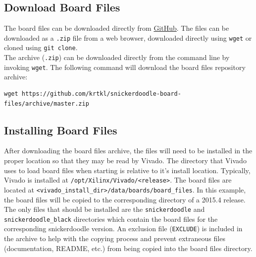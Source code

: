 \subsection{Download Board Files}
The board files can be downloaded directly from \href{https://github.com/krtkl/snickerdoodle-board-files}{GitHub}. The files can be downloaded as a \texttt{.zip} file from a web browser, downloaded directly using \texttt{wget} or cloned using \texttt{git clone}. \\



\noindent
The archive (\texttt{.zip}) can be downloaded directly from the command line by invoking \texttt{wget}. The following command will download the board files repository archive:

\begin{fullwidth}
\begin{lstlisting}[style=text]
wget https://github.com/krtkl/snickerdoodle-board-files/archive/master.zip
\end{lstlisting}
\end{fullwidth}


\subsection{Installing Board Files}


After downloading the board files archive, the files will need to be installed in the proper location so that they may be read by Vivado. The directory that Vivado uses to load board files when starting is relative to it's install location. Typically, Vivado is installed at \texttt{/opt/Xilinx/Vivado/<release>}. The board files are located at \texttt{<vivado\_install\_dir>/data/boards/board\_files}. In this example, the board files will be copied to the corresponding directory of a 2015.4 release. \\

\noindent
The only files that should be installed are the \texttt{snickerdoodle} and \texttt{snickerdoodle\_black} directories which contain the board files for the corresponding snickerdoodle version. An exclusion file (\texttt{EXCLUDE}) is included in the archive to help with the copying process and prevent extraneous files (documentation, README, etc.) from being copied into the board files directory. \\


